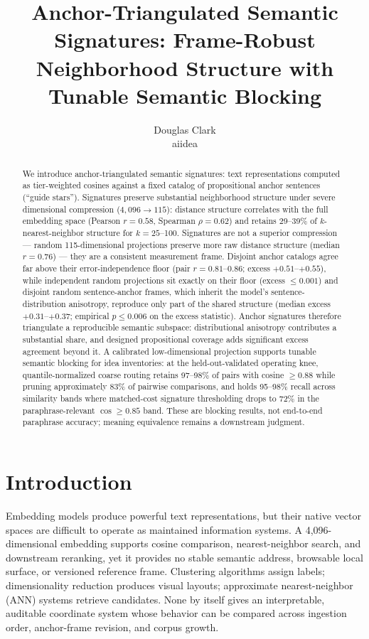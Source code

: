 \documentclass[11pt]{article}
\title{Anchor-Triangulated Semantic Signatures: Frame-Robust Neighborhood Structure with Tunable Semantic Blocking}
\author{Douglas Clark \\
  aiidea}
\begin{document}
\maketitle

\begin{abstract}
We introduce anchor-triangulated semantic signatures: text representations computed as tier-weighted cosines against a fixed catalog of propositional anchor sentences (``guide stars''). Signatures preserve substantial neighborhood structure under severe dimensional compression ($4{,}096\rightarrow115$): distance structure correlates with the full embedding space (Pearson $r=0.58$, Spearman $\rho=0.62$) and retains 29--39\% of $k$-nearest-neighbor structure for $k=25$--100. Signatures are not a superior compression --- random 115-dimensional projections preserve more raw distance structure (median $r=0.76$) --- they are a consistent measurement frame. Disjoint anchor catalogs agree far above their error-independence floor (pair $r=0.81$--$0.86$; excess $+0.51$--$+0.55$), while independent random projections sit exactly on their floor (excess $\leq0.001$) and disjoint random sentence-anchor frames, which inherit the model's sentence-distribution anisotropy, reproduce only part of the shared structure (median excess $+0.31$--$+0.37$; empirical $p\leq0.006$ on the excess statistic). Anchor signatures therefore triangulate a reproducible semantic subspace: distributional anisotropy contributes a substantial share, and designed propositional coverage adds significant excess agreement beyond it. A calibrated low-dimensional projection supports tunable semantic blocking for idea inventories: at the held-out-validated operating knee, quantile-normalized coarse routing retains 97--98\% of pairs with cosine $\geq0.88$ while pruning approximately 83\% of pairwise comparisons, and holds 95--98\% recall across similarity bands where matched-cost signature thresholding drops to 72\% in the paraphrase-relevant $\cos\geq0.85$ band. These are blocking results, not end-to-end paraphrase accuracy; meaning equivalence remains a downstream judgment.
\end{abstract}

\section{Introduction}

Embedding models produce powerful text representations, but their native vector spaces are difficult to operate as maintained information systems. A 4,096-dimensional embedding supports cosine comparison, nearest-neighbor search, and downstream reranking, yet it provides no stable semantic address, browsable local surface, or versioned reference frame. Clustering algorithms assign labels; dimensionality reduction produces visual layouts; approximate nearest-neighbor (ANN) systems retrieve candidates. None by itself gives an interpretable, auditable coordinate system whose behavior can be compared across ingestion order, anchor-frame revision, and corpus growth.
\end{document}
